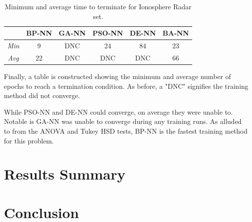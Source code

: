 \documentclass[a4paper,12pt]{article}
\begin{document}
\begin{table}[h!]
\centering
\begin{tabular}{c|c|c|c|c|c|}
\cline{2-6}
 & \textbf{BP-NN} & \textbf{GA-NN} & \textbf{PSO-NN} & \textbf{DE-NN} & \textbf{BA-NN} \\ \hline
\multicolumn{1}{|c|}{\textit{Min}} & \cellcolor[HTML]{C5F1BF}9 & \cellcolor[HTML]{FFCCC9}DNC & 24 & 84 & 23 \\ \hline
\multicolumn{1}{|c|}{\textit{Avg}} & \cellcolor[HTML]{C5F1BF}22 & \cellcolor[HTML]{FFCCC9}DNC & \cellcolor[HTML]{FFCCC9}DNC & \cellcolor[HTML]{FFCCC9}DNC & 66 \\ \hline
\end{tabular}
\caption{Minimum and average time to terminate for Ionosphere Radar set.}
\label{Tab:ionosphere-min}
\end{table}

Finally, a table is constructed showing the minimum and average number of epochs to reach a termination condition. As before, a "DNC" signifies the training method did not converge.

While PSO-NN and DE-NN could converge, on average they were unable to. Notable is GA-NN was unable to converge during any training runs. As alluded to from the ANOVA and Tukey HSD tests, BP-NN is the fastest training method for this problem.

\pagebreak

\section{Results Summary}

\section{Conclusion}



\end{document}
